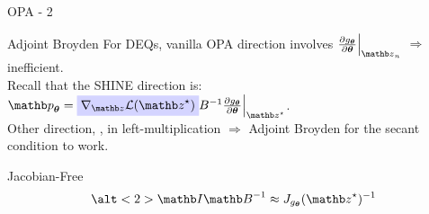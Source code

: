 \begin{frame}{OPA - 2}
\begin{center}
{\begin{algorithm}[H]
{            
        }
        \KwOut{$\zb^\star$, $\Bb$}
    \end{algorithm}
    }
    \end{center}
\end{frame}

\begin{frame}{Adjoint Broyden}
    For DEQs, vanilla OPA direction involves $\frac{\partial g_{\thetab}}{\partial \thetab}\Bigr|_{\zb_n}$ $\Rightarrow$ inefficient.\\

    Recall that the SHINE direction is: $\pb_\thetab =  \highlight{blue}{$\nabla_\zb \mathcal{L}(\zb^\star)$} B^{-1} \frac{\partial g_{\thetab}}{\partial \thetab}\Bigr|_{\zb^\star}$.\\
    Other direction, , in left-multiplication $\Rightarrow$ Adjoint Broyden for the secant condition to work.
\end{frame}

\begin{frame}{Jacobian-Free}
    \begin{equation*}
        \alt<2>{\Ib}{\Bb^{-1}} \approx J_{g_{\thetab}}(\zb^\star)^{-1}
    \end{equation*}
\end{frame}